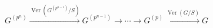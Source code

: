 \(\displaystyle
G^{(p^n)}
  \xrightarrow{\operatorname{Ver}(G^{(p^{n-1})}/S)}
G^{(p^{n-1})}
  \longrightarrow \cdots \longrightarrow
G^{(p)}
  \xrightarrow{\operatorname{Ver}(G/S)}
G
\)
